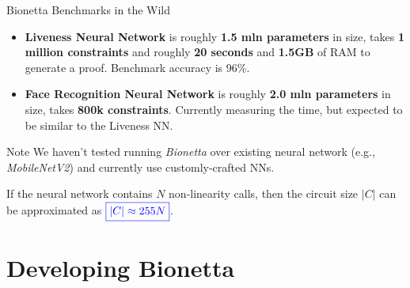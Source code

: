 \documentclass{zkdl-presentation-template}
\newcommand{\cmark}{\textcolor{green!65!black}{\ding{51}}}%
\begin{document}
    \begin{frame}{Bionetta Benchmarks in the Wild}
        \begin{itemize}[label=\cmark]
            \item \textbf{Liveness Neural Network} is roughly \textbf{1.5 mln
            parameters} in size, takes \textbf{1 million constraints} and
            roughly \textbf{20 seconds} and \textbf{1.5GB} of RAM to generate a
            proof. Benchmark accuracy is 96\%.\pause
            \item \textbf{Face Recognition Neural Network} is roughly \textbf{2.0 mln parameters} in size,
            takes \textbf{800k constraints}. Currently measuring the time, but expected to be similar to the Liveness NN.\pause
        \end{itemize}

        \begin{block}{Note}
            We haven't tested running \textit{Bionetta} over existing neural network
            (e.g., \textit{MobileNetV2}) and currently use customly-crafted NNs.\pause
        \end{block}

        If the neural network contains $N$ non-linearity calls, then the circuit size $|C|$
        can be approximated as $\textcolor{blue}{\boxed{|C| \approx 255N}}$.
    \end{frame}

    \section{Developing Bionetta}
\end{document}
